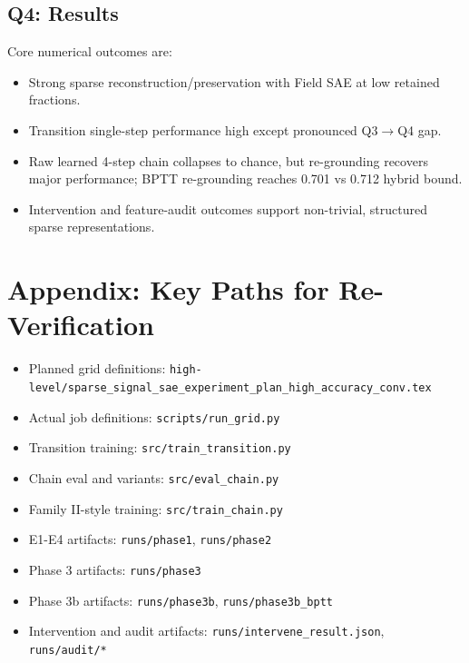 \documentclass[11pt]{article}
\begin{document}
\subsection*{Q4: Results}
Core numerical outcomes are:
\begin{itemize}[leftmargin=*]
    \item Strong sparse reconstruction/preservation with Field SAE at low retained fractions.
    \item Transition single-step performance high except pronounced Q3$\rightarrow$Q4 gap.
    \item Raw learned 4-step chain collapses to chance, but re-grounding recovers major performance; BPTT re-grounding reaches 0.701 vs 0.712 hybrid bound.
    \item Intervention and feature-audit outcomes support non-trivial, structured sparse representations.
\end{itemize}

\section{Appendix: Key Paths for Re-Verification}
\begin{itemize}[leftmargin=*]
    \item Planned grid definitions: \texttt{high-level/sparse\_signal\_sae\_experiment\_plan\_high\_accuracy\_conv.tex}
    \item Actual job definitions: \texttt{scripts/run\_grid.py}
    \item Transition training: \texttt{src/train\_transition.py}
    \item Chain eval and variants: \texttt{src/eval\_chain.py}
    \item Family II-style training: \texttt{src/train\_chain.py}
    \item E1-E4 artifacts: \texttt{runs/phase1}, \texttt{runs/phase2}
    \item Phase 3 artifacts: \texttt{runs/phase3}
    \item Phase 3b artifacts: \texttt{runs/phase3b}, \texttt{runs/phase3b\_bptt}
    \item Intervention and audit artifacts: \texttt{runs/intervene\_result.json}, \texttt{runs/audit/*}
\end{itemize}
\end{document}
